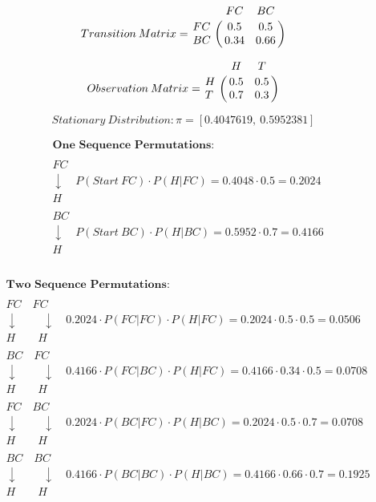 \documentclass[a4paper]{article}
\begin{document}
\begin{sloppypar}
\begin{enumerate}[start=6,label=Q\arabic*,left=0pt]

    \[
        Transition \: Matrix = 
        \bordermatrix{ & FC & BC \cr
        FC & 0.5 & 0.5 \cr
        BC & 0.34 & 0.66 }
    \]

    \[
        Observation \: Matrix = 
        \bordermatrix{ & H & T \cr
        H & 0.5 & 0.5 \cr
        T & 0.7 & 0.3 }
    \]

    \[ Stationary \: Distribution: \pi = [0.4047619, \: 0.5952381] \]

    \begin{align*}
        & \textbf{One Sequence Permutations}:   \\\\
        & FC \\
        & \downarrow \quad P(Start \: FC) \cdot P(H | FC) = 0.4048 \cdot 0.5 = 0.2024 \\
        & H \\\\
        & BC \\
        & \downarrow \quad P(Start \: BC) \cdot P(H | BC) = 0.5952 \cdot 0.7 = 0.4166 \\
        & H \\\\
    \end{align*}

    \begin{align*}
        & \textbf{Two Sequence Permutations}: \\\\
        & FC \quad FC \\
        & \downarrow \quad \quad \: \downarrow \quad 0.2024 \cdot P(FC | FC) \cdot P(H | FC) = 0.2024 \cdot 0.5 \cdot 0.5 = 0.0506 \\
        & H \quad \quad H \\\\
        & BC \quad FC \\
        & \downarrow \quad \quad \: \downarrow \quad 0.4166 \cdot P(FC | BC) \cdot P(H | FC) = 0.4166 \cdot 0.34 \cdot 0.5 = 0.0708 \\
        & H \quad \quad H \\\\
        & FC \quad BC  \\
        & \downarrow \quad \quad \: \downarrow \quad 0.2024 \cdot P(BC | FC) \cdot P(H | BC) = 0.2024 \cdot 0.5 \cdot 0.7 = 0.0708 \\
        & H \quad \quad H \\\\
        & BC \quad BC \\
        & \downarrow \quad \quad \: \downarrow \quad 0.4166 \cdot P(BC | BC) \cdot P(H | BC) = 0.4166 \cdot 0.66 \cdot 0.7 = 0.1925 \\
        & H \quad \quad H
    \end{align*}


\end{enumerate}
\end{sloppypar}
\end{document}
